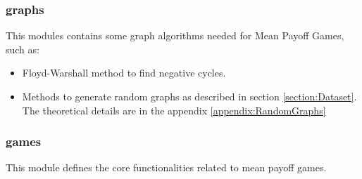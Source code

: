 \subsubsection{graphs}
This modules contains some graph algorithms needed for Mean Payoff Games, such as:
\begin{itemize}
	\item Floyd-Warshall method to find negative cycles.
	\item Methods to generate random graphs as described in section \ref{section:Dataset}. The theoretical details are in the appendix \ref{appendix:RandomGraphs}
\end{itemize}
\subsubsection{games}
This module defines the core functionalities related to mean payoff games.
